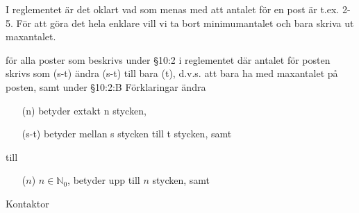 \documentclass[../_main/handlingar.tex]{subfiles}
\begin{document}

I reglementet är det oklart vad som menas med att antalet för en post är t.ex. 2-5. För att göra det hela enklare vill vi ta bort minimumantalet och bara skriva ut maxantalet.

\begin{attsatser}
    \att för alla poster som beskrivs under \S10:2 i reglementet där antalet för posten skrivs som (s-t) ändra (s-t) till bara (t), d.v.s. att bara ha med maxantalet på posten, samt
    \att under \S10:2:B Förklaringar ändra\par
        \begin{itshape}
            \begin{itemize}
                \item[(n)] betyder extakt n stycken,
                \item[(s-t)] betyder mellan s stycken till t stycken, samt
            \end{itemize}
        \end{itshape}\par
        till\par
        \begin{itshape}
            \begin{itemize}
                \item[($n$)] $n \in \mathbb{N}_0$, betyder upp till $n$ stycken, samt
            \end{itemize}
        \end{itshape}
\end{attsatser}

\begin{signatures}{1}
    \ist
    \signature{\sekr}{Kontaktor}
\end{signatures}
\end{document}

